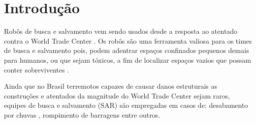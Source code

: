 \documentclass[
	article,			%
	10pt,				%
	oneside,			%
	a4paper,			%
	english,			%
	brazil,				%
	sumario=tradicional	
	]{abntex2}
\begin{document}

%

\textual


\section{Introdução}
Robôs de busca e salvamento vem sendo usados desde a resposta ao atentado contra o World Trade Center \cite{Robin2004}. Os robôs são uma ferramenta valiosa para os times de busca e salvamento pois, podem adentrar espaços confinados pequenos demais para humanos, ou que sejam tóxicos, a fim de localizar espaços vazios que possam conter sobreviventes \cite{Robin2004}.

Ainda que no Brasil terremotos capazes de causar danos estruturais as construções e atentados da magnitude do World Trade Center sejam raros, equipes de busca e salvamento (SAR) são empregadas em casos de: desabamento por chuvas \cite{serrana2022}, rompimento de barragens \cite{bruma2019} entre outros.


\end{document}
